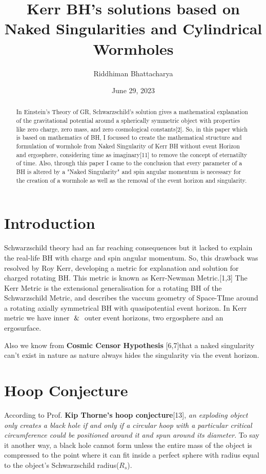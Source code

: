 \documentclass{article}
\title{\Huge \textbf{Kerr BH's solutions based on Naked Singularities and Cylindrical Wormholes}}
\author{Riddhiman Bhattacharya}
\date{June 29, 2023}
\begin{document}
\maketitle



\begin{abstract}
\Large In Einstein's Theory of GR, Schwarzschild's solution gives a mathematical explanation of the gravitational potential around a spherically symmetric object with properties like zero charge, zero mass, and zero cosmological constants[2]. So, in this paper which is based on mathematics of BH, I focussed to create the mathematical structure and formulation of wormhole from Naked Singularity of Kerr BH without event Horizon and ergosphere, considering time as imaginary[11] to remove the concept of eternatilty of time. Also, through this paper I came to the conclusion that every parameter of a BH is altered by a "Naked Singularity" and spin angular momentum is necessary for the creation of a wormhole as well as the removal of the event horizon and singularity.

\end{abstract}

\section{Introduction}
\Large 
Schwarzschild theory had an far reaching consequences but it lacked to explain the real-life BH with charge and spin angular momentum. So, this drawback was resolved by Roy Kerr, developing a metric for explanation and solution for charged rotating BH. This metric is known as Kerr-Newman Metric.[1,3]
The Kerr Metric is the extensional generalisation for a rotating BH of the Schwarzschild Metric, and describes the vaccum geometry of Space-TIme around a rotating axially symmetrical BH with quasipotential event horizon.
In Kerr metric we have inner $\And$ outer event horizons, two ergosphere and an ergosurface.

Also we know from \textbf{Cosmic Censor Hypothesis} [6,7]that a naked singularity can't exist in nature as nature always hides the singularity via the event horizon.

\section{\Large Hoop Conjecture}

\Large According to Prof. \textbf{Kip Thorne's hoop conjecture}[13], \textit{\large an exploding object only creates a black hole if and only if a circular hoop with a particular critical circumference could be positioned around it and spun around its diameter}. \Large To say it another way, a black hole cannot form unless the entire mass of the object is compressed to the point where it can fit inside a perfect sphere with radius equal to the object's Schwarzschild radius($R_s$). 
\end{document}
